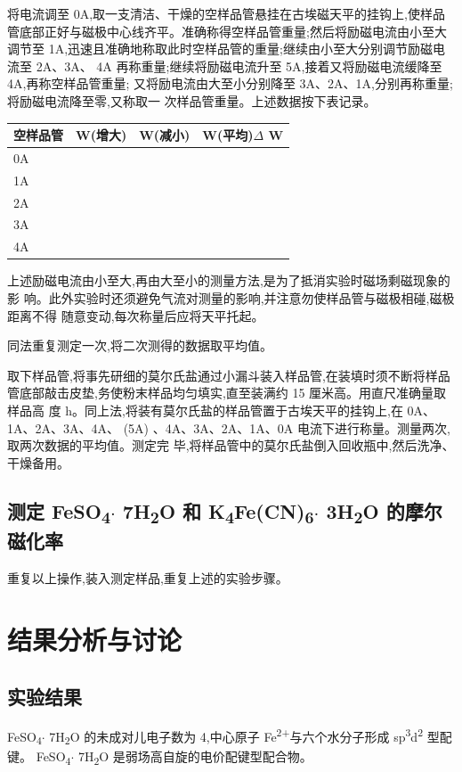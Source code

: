 \documentclass[11pt]{report}
\begin{document}
    将电流调至 0A,取一支清洁、干燥的空样品管悬挂在古埃磁天平的挂钩上,使样品
管底部正好与磁极中心线齐平。准确称得空样品管重量;然后将励磁电流由小至大调节至
1A,迅速且准确地称取此时空样品管的重量;继续由小至大分别调节励磁电流至 2A、3A、
4A 再称重量;继续将励磁电流升至 5A,接着又将励磁电流缓降至 4A,再称空样品管重量;
又将励电流由大至小分别降至 3A、2A、1A,分别再称重量;将励磁电流降至零,又称取一
次样品管重量。上述数据按下表记录。
\begin{center}
\begin{tabular}{llll}
空样品管 & W(增大) & W(减小) & W(平均)\(\Delta\) W\\
\hline
0A &  &  & \\
1A &  &  & \\
2A &  &  & \\
3A &  &  & \\
4A &  &  & \\
\end{tabular}
\end{center}

上述励磁电流由小至大,再由大至小的测量方法,是为了抵消实验时磁场剩磁现象的影
响。此外实验时还须避免气流对测量的影响,并注意勿使样品管与磁极相碰,磁极距离不得
随意变动,每次称量后应将天平托起。

同法重复测定一次,将二次测得的数据取平均值。

取下样品管,将事先研细的莫尔氏盐通过小漏斗装入样品管,在装填时须不断将样品
管底部敲击皮垫,务使粉末样品均匀填实,直至装满约 15 厘米高。用直尺准确量取样品高
度 h。同上法,将装有莫尔氏盐的样品管置于古埃天平的挂钩上,在 0A、1A、2A、3A、4A、
(5A) 、4A、3A、2A、1A、0A 电流下进行称量。测量两次,取两次数据的平均值。测定完
毕,将样品管中的莫尔氏盐倒入回收瓶中,然后洗净、干燥备用。

\section{测定 FeSO\textsubscript{4}\(\cdot\) 7H\textsubscript{2}O 和 K\textsubscript{4}Fe(CN)\textsubscript{6}\(\cdot\) 3H\textsubscript{2}O 的摩尔磁化率}
\label{sec:org6d79d2f}
重复以上操作,装入测定样品,重复上述的实验步骤。

\chapter{结果分析与讨论}
\label{sec:orgfe10e09}
\section{实验结果}
\label{sec:orgde84547}
   FeSO\textsubscript{4}\(\cdot\) 7H\textsubscript{2}O 的未成对儿电子数为 4,中心原子 Fe\textsuperscript{2+}与六个水分子形成 sp\textsuperscript{3}d\textsuperscript{2} 型配键。
FeSO\textsubscript{4}\(\cdot\) 7H\textsubscript{2}O 是弱场高自旋的电价配键型配合物。
\end{document}
